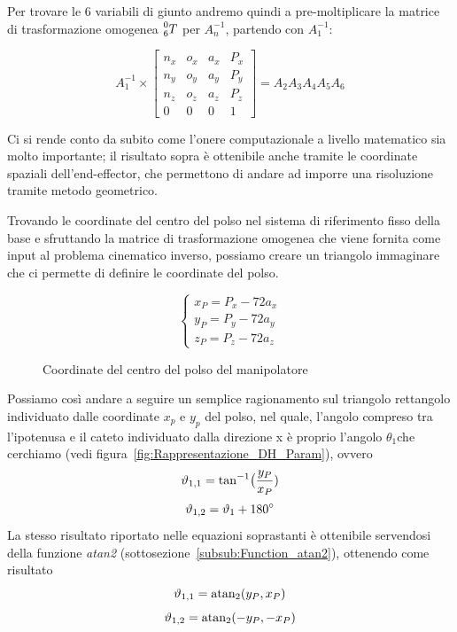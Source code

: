 Per trovare le 6 variabili di giunto andremo quindi a pre-moltiplicare la matrice di trasformazione omogenea $\prescript{0}{6}{T}$ per $A_n^{-1}$, partendo con $A_1^{-1}$:
\begin{figure}[h]
	\label{fig:Metodo_matematico_InvKin}
	\centering
	\begin{equation*}
		A_1^{-1}\times 
		\begin{bmatrix}
			n_x & o_x & a_x & P_x\\
			n_y & o_y & a_y & P_y\\
			n_z & o_z & a_z & P_z\\
			0   & 0   & 0   & 1
		\end{bmatrix}
		=A_2A_3A_4A_5A_6
	\end{equation*}	
\end{figure}


Ci si rende conto da subito come l'onere computazionale a livello matematico sia molto importante; il risultato sopra è ottenibile anche tramite le coordinate spaziali dell'end-effector, che permettono di andare ad imporre una risoluzione tramite metodo geometrico.

Trovando le coordinate del centro del polso nel sistema di riferimento fisso della base e sfruttando la matrice di trasformazione omogenea che viene fornita come input al problema cinematico inverso, possiamo creare un triangolo immaginare che ci permette di definire le coordinate del polso.
\begin{figure}[h]
	\caption{Coordinate del centro del polso del manipolatore}
	\label{fig:Coord_Polso}
	\centering
	\begin{equation*}
		\begin{cases}
			x_P= P_x - 72a_x\\
			y_P= P_y - 72a_y\\
			z_P= P_z - 72a_z		
		\end{cases}
	\end{equation*}
\end{figure}

Possiamo così andare a seguire un semplice ragionamento sul triangolo rettangolo individuato dalle coordinate $x_p$ e $y_p$ del polso, nel quale, l'angolo compreso tra l'ipotenusa e il cateto individuato dalla direzione x è proprio l'angolo $\theta_1$che cerchiamo (vedi figura~\vref{fig:Rappresentazione_DH_Param}), ovvero
\begin{equation*}
	\centering
	\theta_{1,1} = \tan^{-1} \bigl(\frac{y_P}{x_P})
\end{equation*}
\begin{equation*}
	\centering
	\theta_{1,2} = \theta_1+\ang{180}
\end{equation*}
La stesso risultato riportato nelle equazioni soprastanti è ottenibile servendosi della funzione \emph{atan2} (sottosezione~\vref{subsub:Function_atan2}), ottenendo come risultato
\begin{equation*}
	\centering
	\theta_{1,1} = \atantwo(y_P,x_P)
\end{equation*}
\begin{equation*}
	\centering
	\theta_{1,2} = \atantwo(-y_P,-x_P)
\end{equation*}

